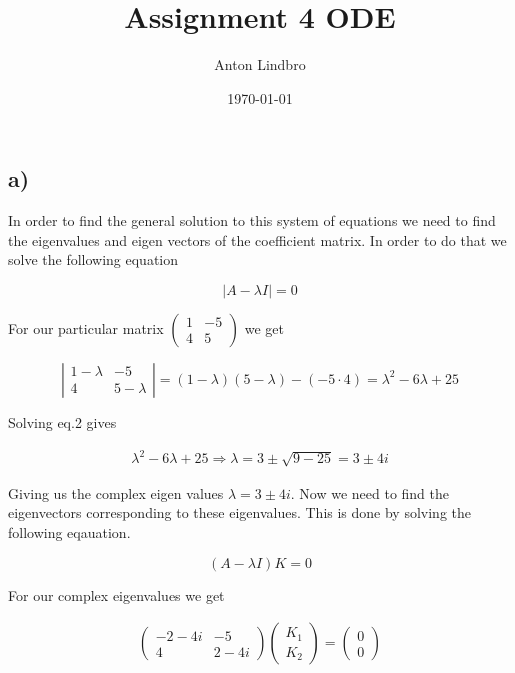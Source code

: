 \documentclass[a4paper]{article}
\title{Assignment 4 ODE}
\author{Anton Lindbro}
\date{\today}
\begin{document}
\maketitle

\section{}
\subsection*{a)}

In order to find the general solution to this system of equations we need to find the eigenvalues and eigen vectors of the coefficient matrix. In order to do that we solve the following equation

\begin{equation}
    |A-\lambda I| = 0
\end{equation}

For our particular matrix $\left(
    \begin{matrix}
        1 & -5 \\
        4 & 5
    \end{matrix}
\right)$ we get

\begin{equation}
    \left|
        \begin{matrix}
            1-\lambda & -5 \\
            4 & 5 - \lambda
        \end{matrix}
    \right| = (1-\lambda)(5-\lambda) - (-5 \cdot 4) = \lambda^2 - 6\lambda + 25
\end{equation}

Solving eq.2 gives

\begin{align}
    \lambda^2 - 6\lambda + 25 \Rightarrow \lambda = 3 \pm \sqrt{9-25} = 3 \pm 4i
\end{align}

Giving us the complex eigen values $\lambda = 3 \pm 4i$. Now we need to find the eigenvectors corresponding to these eigenvalues. This is done by solving the following eqauation.

\begin{equation}
    (A-\lambda I)K = 0
\end{equation}

For our complex eigenvalues we get

\begin{align}
    \begin{pmatrix}
        -2-4i & -5 \\
        4 & 2-4i
    \end{pmatrix}
    \begin{pmatrix}
        K_1 \\
        K_2
    \end{pmatrix}
    =
    \begin{pmatrix}
        0 \\
        0
    \end{pmatrix}
\end{align}
\end{document}
